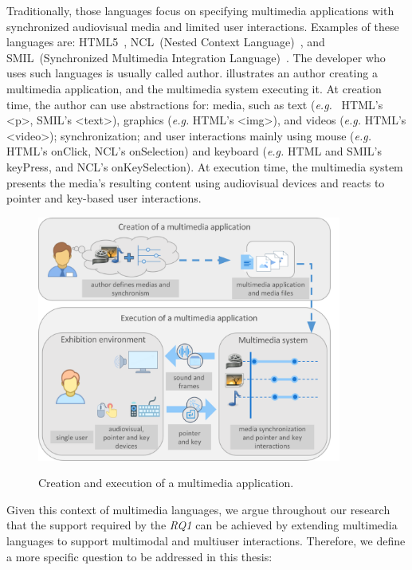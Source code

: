 Traditionally, those languages focus on specifying multimedia applications with
synchronized audiovisual media and limited user interactions. Examples of these
languages are: HTML5~\cite{w3c_html_2014}, NCL~(Nested Context Language)~\cite{abnt_abnt_2016}, and SMIL~(Synchronized
Multimedia Integration Language)~\cite{bulterman_smil_2008}. The developer who uses such languages is
usually called author.  illustrates an author
creating a multimedia application, and the multimedia system executing it. At
creation time, the author can use abstractions for: media, such as text (\textit{e.g.}~
HTML’s <p>, SMIL’s <text>), graphics (\textit{e.g.} HTML’s <img>), and videos
(\textit{e.g.} HTML’s
<video>); synchronization; and user interactions mainly using mouse
(\textit{e.g.} HTML’s
onClick, NCL’s onSelection) and keyboard (\textit{e.g.} HTML and SMIL’s
keyPress, and
NCL’s onKeySelection). At execution time, the multimedia system presents the
media’s resulting content using audiovisual devices and reacts to pointer and
key-based user interactions.

\begin{figure}[!ht]
\begin{center}
	\includegraphics[width=10cm, keepaspectratio]{img/img4.png}
	\caption{Creation and execution of a multimedia application.}
    \captionvspace
	\label{fig:overview-multimedia}
\end{center}
\end{figure}

Given this context of multimedia languages, we argue throughout our research
that the support required by the \textit{RQ1} can be achieved by extending
multimedia languages to support multimodal and multiuser interactions.
Therefore, we define a more specific question to be addressed in this thesis:

